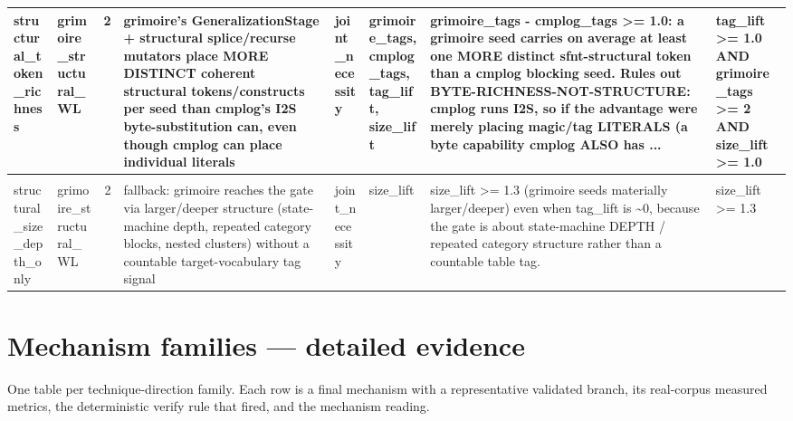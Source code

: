 \documentclass[7pt]{extarticle}
\begin{document}
{\begin{longtable}{@{}p{2.4cm}p{1.9cm}rp{4.3cm}p{1.5cm}p{1.7cm}p{4.6cm}p{3.0cm}@{}}
structural\_\allowbreak token\_\allowbreak richness & grimoire\_\allowbreak structural\_\allowbreak WL & 2 & grimoire's GeneralizationStage + structural splice/recurse mutators place MORE DISTINCT coherent structural tokens/constructs per seed than cmplog's I2S byte-substitution can, even though cmplog can place individual literals & joint\_\allowbreak necessity & grimoire\_\allowbreak tags, cmplog\_\allowbreak tags, tag\_\allowbreak lift, size\_\allowbreak lift & grimoire\_\allowbreak tags - cmplog\_\allowbreak tags \textgreater{}= 1.0: a grimoire seed carries on average at least one MORE distinct sfnt-structural token than a cmplog blocking seed. Rules out BYTE-RICHNESS-NOT-STRUCTURE: cmplog runs I2S, so if the advantage were merely placing magic/tag LITERALS (a byte capability cmplog ALSO has ... & tag\_\allowbreak lift \textgreater{}= 1.0 AND grimoire\_\allowbreak tags \textgreater{}= 2 AND size\_\allowbreak lift \textgreater{}= 1.0\\
\midrule
\rowcolor{black!10}\multicolumn{8}{@{}l}{\textbf{[grimoire]\ \ grimoire\_\allowbreak structural\_\allowbreak size\_\allowbreak depth}\quad(final feature, n=2)}\\
structural\_\allowbreak size\_\allowbreak depth\_\allowbreak only & grimoire\_\allowbreak structural\_\allowbreak WL & 2 & fallback: grimoire reaches the gate via larger/deeper structure (state-machine depth, repeated category blocks, nested clusters) without a countable target-vocabulary tag signal & joint\_\allowbreak necessity & size\_\allowbreak lift & size\_\allowbreak lift \textgreater{}= 1.3 (grimoire seeds materially larger/deeper) even when tag\_\allowbreak lift is \textasciitilde{}0, because the gate is about state-machine DEPTH / repeated category structure rather than a countable table tag. & size\_\allowbreak lift \textgreater{}= 1.3\\
\midrule
\bottomrule\end{longtable}}
\clearpage\section*{Mechanism families --- detailed evidence}
\noindent\small One table per technique-direction family. Each row is a final mechanism with a representative validated branch, its real-corpus measured metrics, the deterministic verify rule that fired, and the mechanism reading.\\[4pt]
\end{document}
